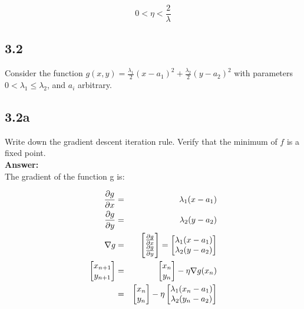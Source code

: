 \documentclass[a4paper]{article}
\begin{document}
\begin{equation}
0 < \eta < \frac{2}{\lambda }
\end{equation}




\subsection*{3.2}

Consider the function $g(x, y) = \frac{\lambda_1}{2}(x - a_1)^2 + \frac{\lambda_2}{2} (y - a_2)^2$ with parameters $0 < \lambda_1 \leq \lambda_2$, and $a_i$ arbitrary.

\subsection*{3.2a}

Write down the gradient descent iteration rule. Verify that the minimum of $f$ is a fixed point.\\

\textbf{Answer:}\\

The gradient of the function g is:

\begin{eqnarray}
\pdv{g}{x} &=& \lambda_1(x-a_1)\\
\pdv{g}{y} &=& \lambda_2(y-a_2)\\
\nabla g &=& \begin{bmatrix}
\pdv{g}{x}\\
\pdv{g}{y}
\end{bmatrix} = \begin{bmatrix}
\lambda_1 (x-a_1)\\
\lambda_2 (y-a_2)
\end{bmatrix}\\
\begin{bmatrix}
x_{n+1}\\
y_{n+1}
\end{bmatrix} &=& \begin{bmatrix}
x_n\\
y_n
\end{bmatrix} -  \eta \nabla g(x_n)\\
&=& \begin{bmatrix}
x_n\\
y_n
\end{bmatrix} - \eta \begin{bmatrix}
\lambda_1 (x_n-a_1)\\
\lambda_2 (y_n-a_2)
\end{bmatrix}
\end{eqnarray}
\end{document}
